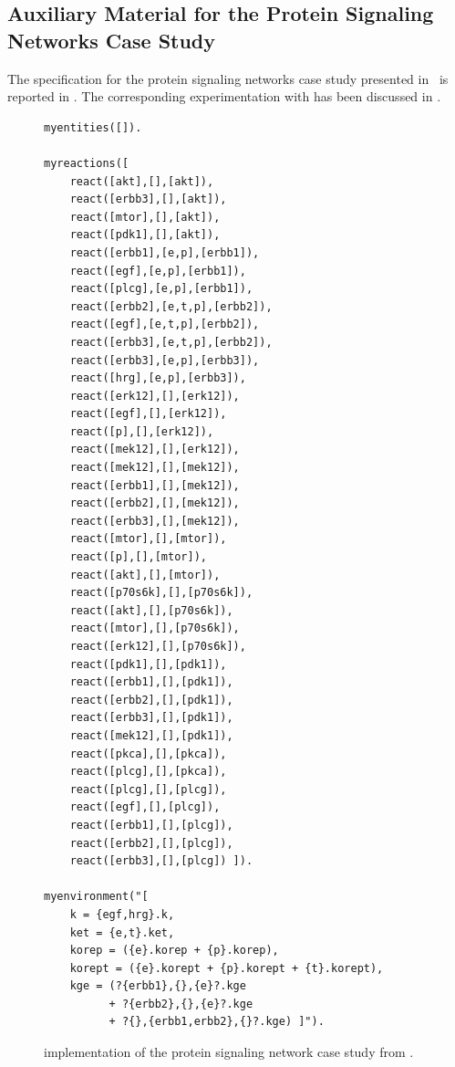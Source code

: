 \subsection{Auxiliary Material for the Protein Signaling Networks Case Study}\label{app:psn}

The \BioResolve specification for the protein signaling networks case study presented in~\cite{DBLP:conf/cmsb/BallisBFO24} is reported in . The corresponding experimentation with \GROOVE has been discussed in .


\begin{figure}[t]
\begin{minipage}{0.9\linewidth}
\footnotesize
\begin{verbatim}
myentities([]).

myreactions([
    react([akt],[],[akt]),
    react([erbb3],[],[akt]),
    react([mtor],[],[akt]),
    react([pdk1],[],[akt]),
    react([erbb1],[e,p],[erbb1]),
    react([egf],[e,p],[erbb1]),
    react([plcg],[e,p],[erbb1]),
    react([erbb2],[e,t,p],[erbb2]),
    react([egf],[e,t,p],[erbb2]),
    react([erbb3],[e,t,p],[erbb2]),
    react([erbb3],[e,p],[erbb3]),
    react([hrg],[e,p],[erbb3]),
    react([erk12],[],[erk12]),
    react([egf],[],[erk12]),
    react([p],[],[erk12]),
    react([mek12],[],[erk12]),
    react([mek12],[],[mek12]),
    react([erbb1],[],[mek12]),
    react([erbb2],[],[mek12]),
    react([erbb3],[],[mek12]),
    react([mtor],[],[mtor]),
    react([p],[],[mtor]),
    react([akt],[],[mtor]),
    react([p70s6k],[],[p70s6k]),
    react([akt],[],[p70s6k]),
    react([mtor],[],[p70s6k]),
    react([erk12],[],[p70s6k]),
    react([pdk1],[],[pdk1]),
    react([erbb1],[],[pdk1]),
    react([erbb2],[],[pdk1]),
    react([erbb3],[],[pdk1]),
    react([mek12],[],[pdk1]),
    react([pkca],[],[pkca]),
    react([plcg],[],[pkca]),
    react([plcg],[],[plcg]),
    react([egf],[],[plcg]),
    react([erbb1],[],[plcg]),
    react([erbb2],[],[plcg]),
    react([erbb3],[],[plcg]) ]).

myenvironment("[
    k = {egf,hrg}.k,
    ket = {e,t}.ket,
    korep = ({e}.korep + {p}.korep),
    korept = ({e}.korept + {p}.korept + {t}.korept),
    kge = (?{erbb1},{},{e}?.kge 
          + ?{erbb2},{},{e}?.kge 
          + ?{},{erbb1,erbb2},{}?.kge) ]").

\end{verbatim}
\end{minipage}
\caption{\BioResolve implementation of the protein signaling network case study from .}
\label{fig:bioresolve:psn}
\end{figure}


